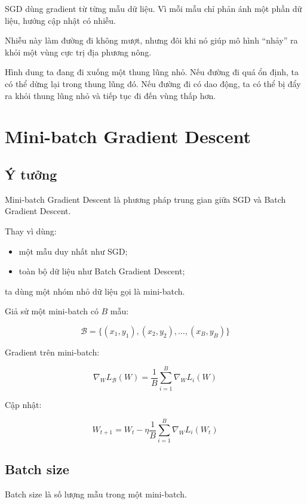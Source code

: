 \documentclass[12pt,a4paper]{report}
\begin{document}
SGD dùng gradient từ từng mẫu dữ liệu. Vì mỗi mẫu chỉ phản ánh một phần dữ liệu, hướng cập nhật có nhiễu.

Nhiễu này làm đường đi không mượt, nhưng đôi khi nó giúp mô hình ``nhảy'' ra khỏi một vùng cực trị địa phương nông.

\begin{vidu}
Hình dung ta đang đi xuống một thung lũng nhỏ. Nếu đường đi quá ổn định, ta có thể dừng lại trong thung lũng đó. Nếu đường đi có dao động, ta có thể bị đẩy ra khỏi thung lũng nhỏ và tiếp tục đi đến vùng thấp hơn.
\end{vidu}

\chapter{Mini-batch Gradient Descent}

\section{Ý tưởng}

Mini-batch Gradient Descent là phương pháp trung gian giữa SGD và Batch Gradient Descent.

Thay vì dùng:

\begin{itemize}
    \item một mẫu duy nhất như SGD;
    \item toàn bộ dữ liệu như Batch Gradient Descent;
\end{itemize}

ta dùng một nhóm nhỏ dữ liệu gọi là mini-batch.

Giả sử một mini-batch có $B$ mẫu:

\[
    \mathcal{B}
    =
    \{(x_1,y_1),(x_2,y_2),\ldots,(x_B,y_B)\}
\]

Gradient trên mini-batch:

\[
    \nabla_W L_{\mathcal{B}}(W)
    =
    \frac{1}{B}
    \sum_{i=1}^{B}
    \nabla_W L_i(W)
\]

Cập nhật:

\[
    W_{t+1}
    =
    W_t
    -
    \eta
    \frac{1}{B}
    \sum_{i=1}^{B}
    \nabla_W L_i(W_t)
\]

\section{Batch size}

Batch size là số lượng mẫu trong một mini-batch.
\end{document}
